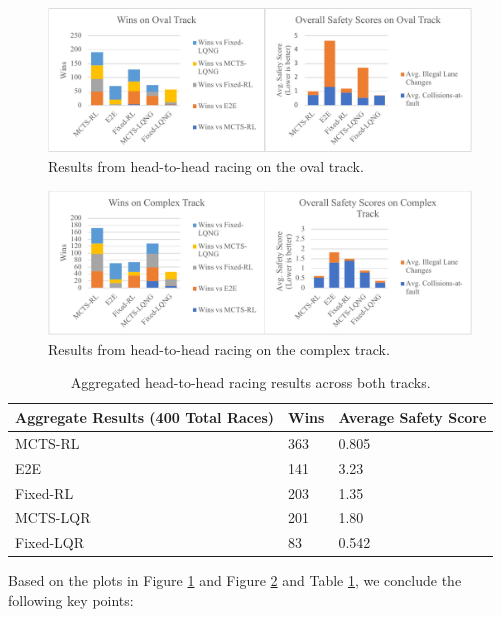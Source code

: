 \begin{figure}
  \centering
  \includegraphics[width=\textwidth]{Figures/HeadOvalResultsFinal.pdf}
  \caption{Results from head-to-head racing on the oval track.}
  \label{fig:results_oval}
\end{figure}

\begin{figure}
\centering
  \includegraphics[width=\textwidth]{Figures/HeadComplexResultsFinal.pdf}
  \caption{Results from head-to-head racing on the complex track.}
  \label{fig:results_complex}
\end{figure}

\begin{table}[!ht]
    \centering
    \begin{tabular}{|p{4cm}|l|l|}
    \hline
        \textbf{Aggregate Results (400 Total Races)} & \textbf{Wins} & \textbf{Average Safety Score} \\ \hline
        MCTS-RL & 363 & 0.805 \\ \hline
        E2E & 141 & 3.23 \\ \hline
        Fixed-RL & 203 & 1.35  \\ \hline
        MCTS-LQR & 201 & 1.80 \\ \hline
        Fixed-LQR & 83 & 0.542 \\ \hline
    \end{tabular}
    \caption[Aggregated head-to-head racing results.]{Aggregated head-to-head racing results across both tracks.}
    \label{tab:aggr_results}
\end{table}
Based on the plots in Figure \ref{fig:results_oval} and Figure \ref{fig:results_complex} and Table \ref{tab:aggr_results}, we conclude the following key points:

